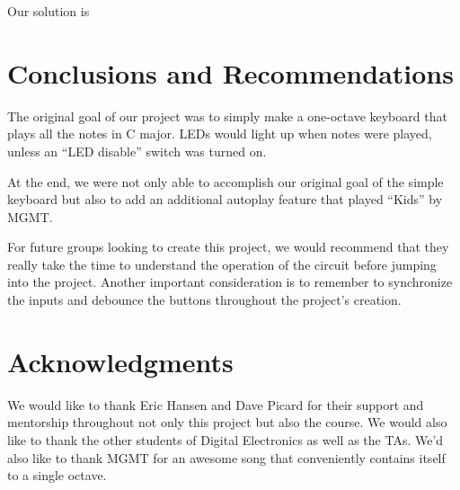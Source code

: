 \documentclass{article}
\begin{document}
  Our solution is 

\section{Conclusions and Recommendations}


  The original goal of our project was to simply make a one-octave keyboard that plays all the notes in C major. LEDs would light up when notes were played, unless an ``LED disable'' switch was turned on.

  At the end, we were not only able to accomplish our original goal of the simple keyboard but also to add an additional autoplay feature that played ``Kids'' by MGMT.

  For future groups looking to create this project, we would recommend that they really take the time to understand the operation of the circuit before jumping into the project. Another important consideration is to remember to synchronize the inputs and debounce the buttons throughout the project's creation.

\section{Acknowledgments}

  

  We would like to thank Eric Hansen and Dave Picard for their support and mentorship throughout not only this project but also the course. We would also like to thank the other students of Digital Electronics as well as the TAs. We'd also like to thank MGMT for an awesome song that conveniently contains itself to a single octave.
\end{document}
